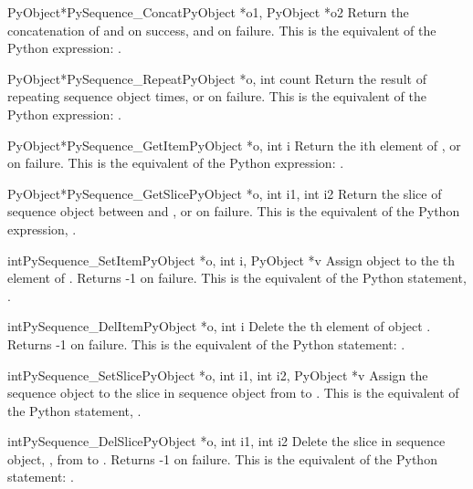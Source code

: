 \documentclass[twoside,openright]{report}
\begin{document}
\begin{cfuncdesc}{PyObject*}{PySequence_Concat}{PyObject *o1, PyObject *o2}
Return the concatenation of  and  on success, and \NULL{} on
failure.   This is the equivalent of the Python
expression: .
\end{cfuncdesc}


\begin{cfuncdesc}{PyObject*}{PySequence_Repeat}{PyObject *o, int count}
Return the result of repeating sequence object   times,
or \NULL{} on failure.  This is the equivalent of the Python
expression: .
\end{cfuncdesc}


\begin{cfuncdesc}{PyObject*}{PySequence_GetItem}{PyObject *o, int i}
Return the ith element of , or \NULL{} on failure. This is the
equivalent of the Python expression: .
\end{cfuncdesc}


\begin{cfuncdesc}{PyObject*}{PySequence_GetSlice}{PyObject *o, int i1, int i2}
Return the slice of sequence object  between  and , or
\NULL{} on failure. This is the equivalent of the Python
expression, .
\end{cfuncdesc}


\begin{cfuncdesc}{int}{PySequence_SetItem}{PyObject *o, int i, PyObject *v}
Assign object  to the th element of .
Returns -1 on failure.  This is the equivalent of the Python
statement, .
\end{cfuncdesc}

\begin{cfuncdesc}{int}{PySequence_DelItem}{PyObject *o, int i}
Delete the th element of object .  Returns
-1 on failure.  This is the equivalent of the Python
statement: .
\end{cfuncdesc}

\begin{cfuncdesc}{int}{PySequence_SetSlice}{PyObject *o, int i1, int i2, PyObject *v}
Assign the sequence object  to the slice in sequence
object  from  to .  This is the equivalent of the Python
statement, .
\end{cfuncdesc}

\begin{cfuncdesc}{int}{PySequence_DelSlice}{PyObject *o, int i1, int i2}
Delete the slice in sequence object, , from  to .
Returns -1 on failure. This is the equivalent of the Python
statement: .
\end{cfuncdesc}
\end{document}
